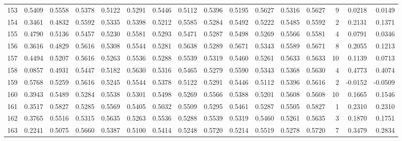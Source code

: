 \begin{tabular}{lrrrrrrrrrrrrrrr}
153 &      0.5409 &  0.5558 &  0.5378 &  0.5122 &  0.5291 &  0.5446 &  0.5112 &  0.5396 &  0.5195 &  0.5627 &   0.5316 &     0.5627 &      9 &                    0.0218 &                     0.0149 \\
154 &      0.3461 &  0.4832 &  0.5592 &  0.5335 &  0.5398 &  0.5212 &  0.5585 &  0.5284 &  0.5492 &  0.5222 &   0.5485 &     0.5592 &      2 &                    0.2131 &                     0.1371 \\
155 &      0.4790 &  0.5136 &  0.5457 &  0.5230 &  0.5581 &  0.5293 &  0.5471 &  0.5287 &  0.5498 &  0.5269 &   0.5566 &     0.5581 &      4 &                    0.0791 &                     0.0346 \\
156 &      0.3616 &  0.4829 &  0.5616 &  0.5308 &  0.5544 &  0.5281 &  0.5638 &  0.5289 &  0.5671 &  0.5343 &   0.5589 &     0.5671 &      8 &                    0.2055 &                     0.1213 \\
157 &      0.4494 &  0.5207 &  0.5616 &  0.5263 &  0.5536 &  0.5288 &  0.5539 &  0.5319 &  0.5460 &  0.5261 &   0.5633 &     0.5633 &     10 &                    0.1139 &                     0.0713 \\
158 &      0.0857 &  0.4931 &  0.5447 &  0.5182 &  0.5630 &  0.5316 &  0.5465 &  0.5279 &  0.5590 &  0.5343 &   0.5368 &     0.5630 &      4 &                    0.4773 &                     0.4074 \\
159 &      0.5768 &  0.5259 &  0.5616 &  0.5245 &  0.5544 &  0.5378 &  0.5122 &  0.5291 &  0.5446 &  0.5112 &   0.5396 &     0.5616 &      2 &                   -0.0152 &                    -0.0509 \\
160 &      0.3943 &  0.5489 &  0.5284 &  0.5538 &  0.5301 &  0.5498 &  0.5269 &  0.5566 &  0.5388 &  0.5201 &   0.5608 &     0.5608 &     10 &                    0.1665 &                     0.1546 \\
161 &      0.3517 &  0.5827 &  0.5285 &  0.5569 &  0.5405 &  0.5032 &  0.5509 &  0.5295 &  0.5461 &  0.5287 &   0.5505 &     0.5827 &      1 &                    0.2310 &                     0.2310 \\
162 &      0.3765 &  0.5516 &  0.5315 &  0.5635 &  0.5263 &  0.5536 &  0.5288 &  0.5539 &  0.5319 &  0.5460 &   0.5261 &     0.5635 &      3 &                    0.1870 &                     0.1751 \\
163 &      0.2241 &  0.5075 &  0.5660 &  0.5387 &  0.5100 &  0.5414 &  0.5248 &  0.5720 &  0.5214 &  0.5519 &   0.5278 &     0.5720 &      7 &                    0.3479 &                     0.2834 \\

\end{tabular}
